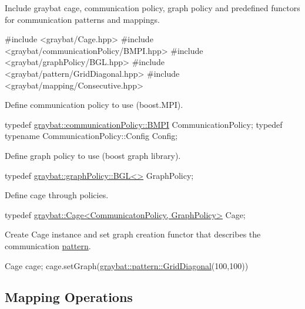 \begin{DoxyEnumerate}
\item Include graybat cage, communication policy, graph policy and predefined functors for communication patterns and mappings. 
\begin{DoxyCode}
\textcolor{preprocessor}{#include <graybat/Cage.hpp>}
\textcolor{preprocessor}{#include <graybat/communicationPolicy/BMPI.hpp>}
\textcolor{preprocessor}{#include <graybat/graphPolicy/BGL.hpp>}
\textcolor{preprocessor}{#include <graybat/pattern/GridDiagonal.hpp>}
\textcolor{preprocessor}{#include <graybat/mapping/Consecutive.hpp>}
\end{DoxyCode}

\item Define communication policy to use (boost.\+M\+P\+I). 
\begin{DoxyCode}
\textcolor{keyword}{typedef} \hyperlink{structgraybat_1_1communicationPolicy_1_1BMPI}{graybat::communicationPolicy::BMPI}   CommunicationPolicy;
\textcolor{keyword}{typedef} \textcolor{keyword}{typename} CommunicationPolicy::Config Config;
\end{DoxyCode}

\item Define graph policy to use (boost graph library). 
\begin{DoxyCode}
\textcolor{keyword}{typedef} \hyperlink{classgraybat_1_1graphPolicy_1_1BGL}{graybat::graphPolicy::BGL<>} GraphPolicy;
\end{DoxyCode}

\item Define cage through policies. 
\begin{DoxyCode}
\textcolor{keyword}{typedef} \hyperlink{structgraybat_1_1Cage}{graybat::Cage<CommunicatonPolicy, GraphPolicy>} Cage;
\end{DoxyCode}

\item Create Cage instance and set graph creation functor that describes the communication \hyperlink{communicationPattern}{pattern}. 
\begin{DoxyCode}
Cage cage;
cage.setGraph(\hyperlink{structgraybat_1_1pattern_1_1GridDiagonal}{graybat::pattern::GridDiagonal}(100,100))
\end{DoxyCode}

\end{DoxyEnumerate}

\subsection*{Mapping Operations}


